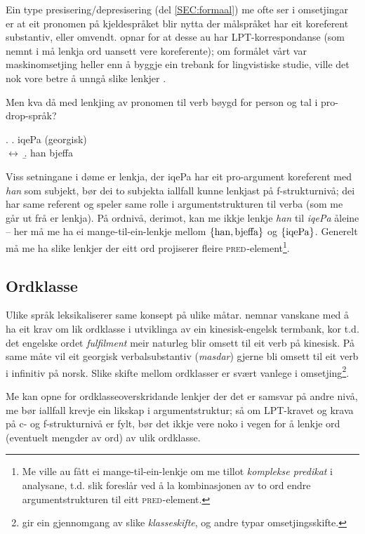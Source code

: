 \documentclass[12pt,a4paper,oneside,draft]{report}
\newcommand{\F}[2]{\textsc{#1}\ensuremath{_{#2}}}
\newcommand{\PRED}{\F{pred}{}}
\begin{document}
Ein type presisering/depresisering (del \ref{SEC:formaal}) me ofte ser
 i omsetjingar er at eit pronomen på kjeldespråket blir nytta der
 målspråket har eit koreferent substantiv, eller
 omvendt. \citet{dyvik2009lmp} opnar for at desse au har
 LPT-korrespondanse (som nemnt i \cite{thunes2003eal} må lenkja ord
 uansett vere koreferente); om formålet vårt var maskinomsetjing
 heller enn å byggje ein trebank for lingvistiske studie, ville det
 nok vore betre å unngå slike lenkjer \citep[s.~53]{volk2008hjp}.

Men kva då med lenkjing av pronomen til verb bøygd for person og tal i
pro-drop-språk?

\ex. \a. iqePa                                  \hfill{} (georgisk) \\
     $\leftrightarrow$
     \b. han bjeffa

Viss setningane i døme \Last er lenkja, der iqePa har eit pro-argument
koreferent med \emph{han} som subjekt, bør dei to subjekta iallfall kunne
lenkjast på f-strukturnivå; dei har same referent og speler same rolle
i argumentstrukturen til verba (som me går ut frå er lenkja). På
ordnivå, derimot, kan me ikkje lenkje \emph{han} til \emph{iqePa} åleine -- her
må me ha ei mange-til-ein-lenkje mellom $\{ \rm han, bjeffa \}$ og $\{
\rm iqePa \}$. 
Generelt må me ha slike lenkjer der eitt ord projiserer fleire
\PRED{}-element\footnote{Me ville au fått ei mange-til-ein-lenkje om me tillot
        \emph{komplekse predikat} i analysane, t.d. slik
        \citet{butt1998merger} foreslår ved å la kombinasjonen av to
        ord endre argumentstrukturen til eitt \PRED{}-element. }.

\subsection{Ordklasse}
\label{sec-3.5.1}

Ulike språk leksikaliserer same konsept på ulike
måtar. \citet[s.~3]{cheung2002scg} nemnar vanskane med å ha eit krav
om lik ordklasse i utviklinga av ein kinesisk-engelsk termbank, kor
t.d. det engelske ordet \emph{fulfilment} meir naturleg blir omsett til eit
verb på kinesisk. På same måte vil eit georgisk verbalsubstantiv
(\emph{masdar}) gjerne bli omsett til eit verb i infinitiv på
norsk. Slike skifte mellom ordklasser er svært vanlege i
omsetjing\footnote{\citet[Catford~(1965),~i][s.~61]{munday2001its} gir ein gjennomgang av
       slike \emph{klasseskifte}, og andre typar omsetjingsskifte. }.

Me kan opne for ordklasseoverskridande lenkjer der det er samsvar på
andre nivå, me bør iallfall krevje ein likskap i argumentstruktur; så
om LPT-kravet og krava på c- og f-strukturnivå er fylt, bør det ikkje
vere noko i vegen for å lenkje ord (eventuelt mengder av ord) av ulik
ordklasse.
\end{document}
